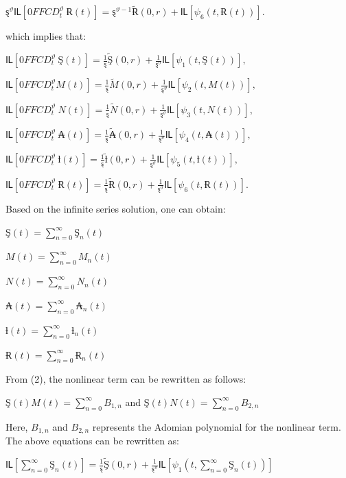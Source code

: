 \(ȿ^{\vartheta}Ỻ\left\lbrack 0FFCD_{t}^{\vartheta}\ Ɍ(t) \right\rbrack = ȿ^{\vartheta - 1}\widetilde{Ɍ}(0,r) + Ỻ\left\lbrack \psi_{6}\left( t,Ɍ(t) \right) \right\rbrack\).

which implies that:

\(Ỻ\left\lbrack 0FFCD_{t}^{\vartheta}\ Ş(t) \right\rbrack = \frac{1}{ȿ}\widetilde{Ş}(0,r) + \frac{1}{ȿ^{\vartheta}}Ỻ\left\lbrack \psi_{1}\left( t,Ş(t) \right) \right\rbrack,\)

\(Ỻ\left\lbrack 0FFCD_{t}^{\vartheta}M(t) \right\rbrack = \frac{1}{ȿ}\widetilde{M}(0,r) + \frac{1}{ȿ^{\vartheta}}Ỻ\left\lbrack \psi_{2}\left( t,M(t) \right) \right\rbrack,\)

\(Ỻ\left\lbrack 0FFCD_{t}^{\vartheta}\ N(t) \right\rbrack = \frac{1}{ȿ}\widetilde{N}(0,r) + \frac{1}{ȿ^{\vartheta}}Ỻ\left\lbrack \psi_{3}\left( t,N(t) \right) \right\rbrack,\)

\(Ỻ\left\lbrack 0FFCD_{t}^{\vartheta}\ ₳(t) \right\rbrack = \frac{1}{ȿ}\widetilde{₳}(0,r) + \frac{1}{ȿ^{\vartheta}}Ỻ\left\lbrack \psi_{4}\left( t,₳(t) \right) \right\rbrack,\)

\(Ỻ\left\lbrack 0FFCD_{t}^{\vartheta}\ ƚ(t) \right\rbrack = \frac{1}{ȿ}\widetilde{ƚ}(0,r) + \frac{1}{ȿ^{\vartheta}}Ỻ\left\lbrack \psi_{5}\left( t,ƚ(t) \right) \right\rbrack,\)

\(Ỻ\left\lbrack 0FFCD_{t}^{\vartheta}\ Ɍ(t) \right\rbrack = \frac{1}{ȿ}\widetilde{Ɍ}(0,r) + \frac{1}{ȿ^{\vartheta}}Ỻ\left\lbrack \psi_{6}\left( t,Ɍ(t) \right) \right\rbrack.\)

Based on the infinite series solution, one can obtain:

\(Ş(t) = \sum_{n = 0}^{\infty}{}Ş_{n}(t)\)

\(M(t) = \sum_{n = 0}^{\infty}{}M_{n}(t)\)

\(N(t) = \sum_{n = 0}^{\infty}{}N_{n}(t)\)

\(₳(t) = \sum_{n = 0}^{\infty}{}₳_{n}(t)\)

\(ƚ(t) = \sum_{n = 0}^{\infty}{}ƚ_{n}(t)\)

\(Ɍ(t) = \sum_{n = 0}^{\infty}{}Ɍ_{n}(t)\)

From (2), the nonlinear term can be rewritten as follows:

\(Ş(t)M(t) = \sum_{n = 0}^{\infty}{}B_{1,n}\) and \(Ş(t)N(t) = \sum_{n = 0}^{\infty}{}B_{2,n}\)

Here, \(B_{1,n}\) and \(B_{2,n}\) represents the Adomian polynomial for the nonlinear term. The above equations can be rewritten as:

\(Ỻ\left\lbrack \sum_{n = 0}^{\infty}{}Ş_{n}(t) \right\rbrack = \frac{1}{ȿ}\widetilde{Ş}(0,r) + \frac{1}{ȿ^{\vartheta}}Ỻ\left\lbrack \psi_{1}\left( t,\sum_{n = 0}^{\infty}{}Ş_{n}(t) \right) \right\rbrack\)

